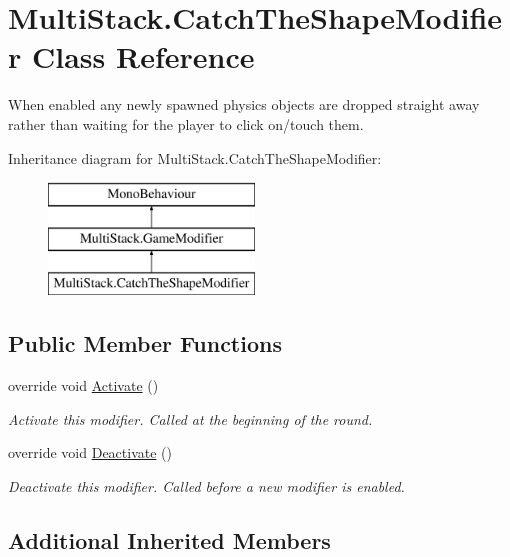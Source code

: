 \hypertarget{class_multi_stack_1_1_catch_the_shape_modifier}{}\section{Multi\+Stack.\+Catch\+The\+Shape\+Modifier Class Reference}
\label{class_multi_stack_1_1_catch_the_shape_modifier}


When enabled any newly spawned physics objects are dropped straight away rather than waiting for the player to click on/touch them.  


Inheritance diagram for Multi\+Stack.\+Catch\+The\+Shape\+Modifier\+:\begin{figure}[H]
\begin{center}
\leavevmode
\includegraphics[height=3.000000cm]{class_multi_stack_1_1_catch_the_shape_modifier}
\end{center}
\end{figure}
\subsection*{Public Member Functions}
\begin{DoxyCompactItemize}
\item 
override void \hyperlink{class_multi_stack_1_1_catch_the_shape_modifier_a5617ebd934298acc024336daa5c633fb}{Activate} ()
\begin{DoxyCompactList}\small\item\em Activate this modifier. Called at the beginning of the round. \end{DoxyCompactList}\item 
override void \hyperlink{class_multi_stack_1_1_catch_the_shape_modifier_ad6ad792bcc0ae5fdd4890af7ec5fe7b1}{Deactivate} ()
\begin{DoxyCompactList}\small\item\em Deactivate this modifier. Called before a new modifier is enabled. \end{DoxyCompactList}\end{DoxyCompactItemize}
\subsection*{Additional Inherited Members}



